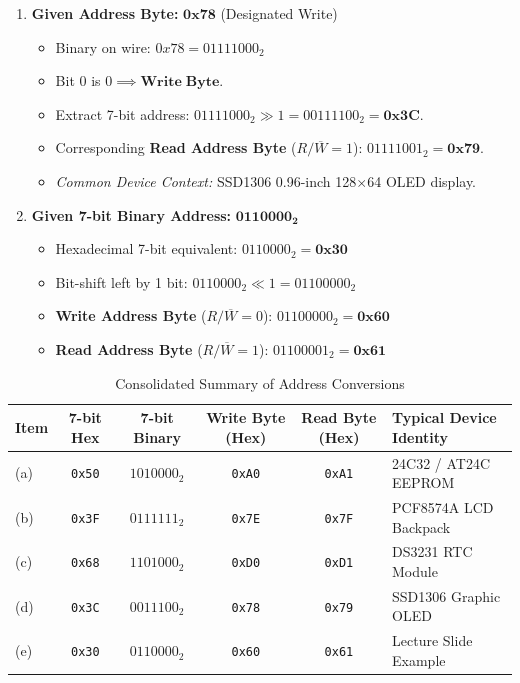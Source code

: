 \documentclass[11pt,a4paper]{article}
\begin{document}
\begin{enumerate}
    \item[\textbf{(d)}] \textbf{Given Address Byte:} $\mathbf{0x78}$ (Designated Write)
    \begin{itemize}
        \item Binary on wire: $0x78 = 01111000_2$
        \item Bit 0 is $0 \implies \mathbf{Write\;Byte}$.
        \item Extract 7-bit address: $01111000_2 \gg 1 = 00111100_2 = \mathbf{0x3C}$.
        \item Corresponding \textbf{Read Address Byte} ($R/\overline{W} = 1$): $01111001_2 = \mathbf{0x79}$.
        \item \textit{Common Device Context:} SSD1306 0.96-inch 128$\times$64 OLED display.
    \end{itemize}

    \item[\textbf{(e)}] \textbf{Given 7-bit Binary Address:} $\mathbf{0110000_2}$
    \begin{itemize}
        \item Hexadecimal 7-bit equivalent: $0110000_2 = \mathbf{0x30}$
        \item Bit-shift left by 1 bit: $0110000_2 \ll 1 = 01100000_2$
        \item \textbf{Write Address Byte} ($R/\overline{W} = 0$): $01100000_2 = \mathbf{0x60}$
        \item \textbf{Read Address Byte} ($R/\overline{W} = 1$): $01100001_2 = \mathbf{0x61}$
    \end{itemize}
\end{enumerate}

\begin{table}[h]
\centering
\small
\caption{Consolidated Summary of Address Conversions}
\vspace{4pt}
\begin{tabularx}{\textwidth}{l c c c c X}
\toprule
\textbf{Item} & \textbf{7-bit Hex} & \textbf{7-bit Binary} & \textbf{Write Byte (Hex)} & \textbf{Read Byte (Hex)} & \textbf{Typical Device Identity} \\
\midrule
(a) & \texttt{0x50} & $1010000_2$ & \texttt{0xA0} & \texttt{0xA1} & 24C32 / AT24C EEPROM \\
(b) & \texttt{0x3F} & $0111111_2$ & \texttt{0x7E} & \texttt{0x7F} & PCF8574A LCD Backpack \\
(c) & \texttt{0x68} & $1101000_2$ & \texttt{0xD0} & \texttt{0xD1} & DS3231 RTC Module \\
(d) & \texttt{0x3C} & $0011100_2$ & \texttt{0x78} & \texttt{0x79} & SSD1306 Graphic OLED \\
(e) & \texttt{0x30} & $0110000_2$ & \texttt{0x60} & \texttt{0x61} & Lecture Slide Example \\
\bottomrule
\end{tabularx}
\end{table}
\end{document}
